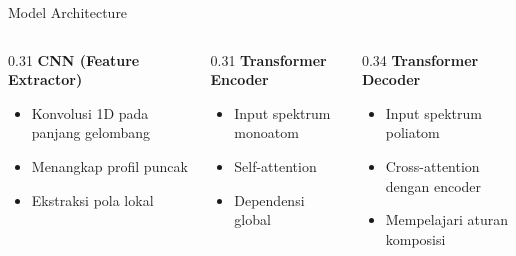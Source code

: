 \documentclass{beamer}
\begin{document}
\begin{frame}{Model Architecture}
  {\small
  \begin{columns}[T,onlytextwidth]
    \begin{column}{0.31\textwidth}
      \textbf{CNN (Feature Extractor)}
      \begin{itemize}\setlength{\itemsep}{1pt}
        \item Konvolusi 1D pada panjang gelombang
        \item Menangkap profil puncak
        \item Ekstraksi pola lokal
      \end{itemize}
    \end{column}
    \begin{column}{0.31\textwidth}
      \textbf{Transformer Encoder}
      \begin{itemize}\setlength{\itemsep}{1pt}
        \item Input spektrum monoatom
        \item Self-attention
        \item Dependensi global
      \end{itemize}
    \end{column}
    \begin{column}{0.34\textwidth}
      \textbf{Transformer Decoder}
      \begin{itemize}\setlength{\itemsep}{1pt}
        \item Input spektrum poliatom
        \item Cross-attention dengan encoder
        \item Mempelajari aturan komposisi
      \end{itemize}
    \end{column}
  \end{columns}
  }
\end{frame}
\end{document}
